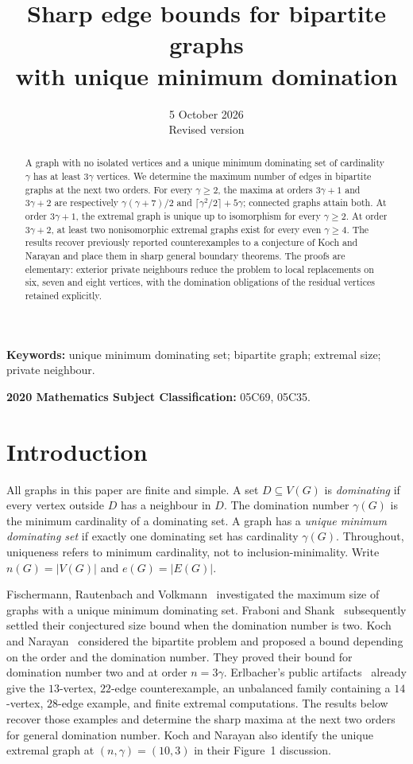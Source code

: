 \documentclass[11pt]{article}
\title{Sharp edge bounds for bipartite graphs\\with unique minimum domination}
\author{}
\date{5 October 2026\\\small Revised version}
\theoremstyle{definition}
\theoremstyle{remark}
\newcommand{\e}{e}
\begin{document}
\maketitle
\begin{abstract}
A graph with no isolated vertices and a unique minimum dominating set of
cardinality $\gamma$ has at least $3\gamma$ vertices. We determine the maximum
number of edges in bipartite graphs at the next two orders. For every
$\gamma\ge2$, the maxima at orders $3\gamma+1$ and $3\gamma+2$ are respectively
$\gamma(\gamma+7)/2$ and $\lceil\gamma^2/2\rceil+5\gamma$; connected graphs
attain both. At order $3\gamma+1$, the extremal graph is unique up to
isomorphism for every $\gamma\ge2$. At order $3\gamma+2$, at least two
nonisomorphic extremal graphs exist for every even $\gamma\ge4$.
The results recover previously reported counterexamples to a conjecture of
Koch and Narayan and place them in sharp general boundary theorems.
The proofs are elementary: exterior private neighbours reduce the problem
to local replacements on six, seven and eight vertices, with the domination
obligations of the residual vertices retained explicitly.
\end{abstract}
\noindent\textbf{Keywords:} unique minimum dominating set; bipartite graph;
extremal size; private neighbour.
\par\smallskip
\noindent\textbf{2020 Mathematics Subject Classification:} 05C69, 05C35.

\section{Introduction}

All graphs in this paper are finite and simple. A set $D\subseteq V(G)$ is
\emph{dominating} if every vertex outside $D$ has a neighbour in $D$.
The domination number $\gamma(G)$ is the minimum cardinality of a dominating
set. A graph has a \emph{unique minimum dominating set} if exactly one dominating
set has cardinality $\gamma(G)$. Throughout, uniqueness refers to minimum
cardinality, not to inclusion-minimality. Write $n(G)=|V(G)|$ and
$\e(G)=|E(G)|$.

Fischermann, Rautenbach and Volkmann~\cite{FRV} investigated the maximum size
of graphs with a unique minimum dominating set. Fraboni and Shank~\cite{FS}
subsequently settled their conjectured size bound when the domination number
is two. Koch and Narayan~\cite{KN} considered the bipartite problem and proposed
a bound depending on the order and the domination number. They proved their
bound for domination number two and at order $n=3\gamma$.
Erlbacher's public artifacts~\cite{E} already give the $13$-vertex, $22$-edge
counterexample, an unbalanced family containing a $14$-vertex, $28$-edge
example, and finite extremal computations. The results below recover those
examples and determine the sharp maxima at the next two orders for general
domination number.
Koch and Narayan also identify the unique extremal graph at
$(n,\gamma)=(10,3)$ in their Figure~1 discussion.
\end{document}
